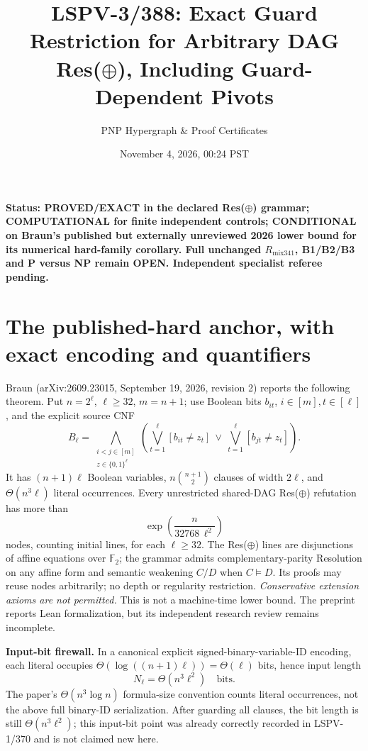 \documentclass[11pt]{article}
\title{LSPV-3/388: Exact Guard Restriction for Arbitrary DAG Res($\oplus$), Including Guard-Dependent Pivots}
\author{PNP Hypergraph \& Proof Certificates}
\date{November 4, 2026, 00:24 PST}
\begin{document}
\maketitle
\noindent\textbf{Status: PROVED/EXACT in the declared Res($\oplus$) grammar; COMPUTATIONAL for finite independent controls; CONDITIONAL on Braun's published but externally unreviewed 2026 lower bound for its numerical hard-family corollary. Full unchanged $R_{\mathrm{mix341}}$, B1/B2/B3 and P versus NP remain OPEN. Independent specialist referee pending.}

\section*{The published-hard anchor, with exact encoding and quantifiers}
Braun (arXiv:2609.23015, September 19, 2026, revision 2) reports the following theorem. Put $n=2^\ell$, $\ell\ge32$, $m=n+1$; use Boolean bits $b_{it}$, $i\in[m],t\in[\ell]$, and the explicit source CNF
\[
B_\ell=\bigwedge_{\substack{i<j\in[m]\\ z\in\{0,1\}^\ell}}
\left(\bigvee_{t=1}^\ell[b_{it}\ne z_t]\ \vee\
\bigvee_{t=1}^\ell[b_{jt}\ne z_t]\right).
\]
It has $(n+1)\ell$ Boolean variables, $n\binom{n+1}{2}$ clauses of width $2\ell$, and $\Theta(n^3\ell)$ literal occurrences. Every unrestricted shared-DAG Res($\oplus$) refutation has more than
\[
\exp\!\left(\frac{n}{32768\,\ell^2}\right)
\]
nodes, counting initial lines, for each $\ell\ge32$. The Res($\oplus$) lines are disjunctions of affine equations over $\mathbb F_2$; the grammar admits complementary-parity Resolution on any affine form and semantic weakening $C/D$ when $C\models D$. Its proofs may reuse nodes arbitrarily; no depth or regularity restriction. \emph{Conservative extension axioms are not permitted.} This is not a machine-time lower bound. The preprint reports Lean formalization, but its independent research review remains incomplete.

\noindent\textbf{Input-bit firewall.} In a canonical explicit signed-binary-variable-ID encoding, each literal occupies $\Theta(\log((n+1)\ell))=\Theta(\ell)$ bits, hence input length
\[
N_\ell=\Theta(n^3\ell^2)\quad\text{bits}.
\]
The paper's $\Theta(n^3\log n)$ formula-size convention counts literal occurrences, not the above full binary-ID serialization. After guarding all clauses, the bit length is still $\Theta(n^3\ell^2)$; this input-bit point was already correctly recorded in LSPV-1/370 and is not claimed new here.
\end{document}
